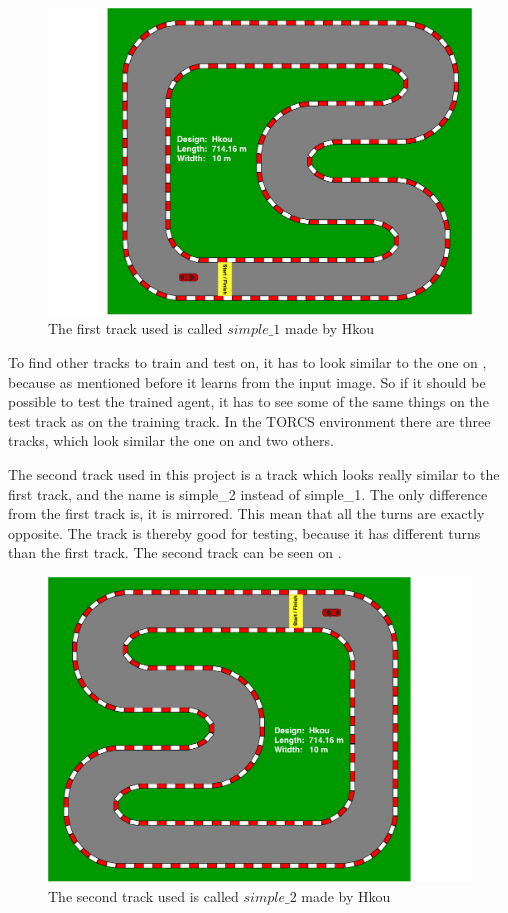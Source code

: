 \begin{figure}[H]
	\centering
	\includegraphics[width=1\textwidth]{Figures/Result/track_simple_1.pdf}
	\caption{The first track used is called $simple\_1$ made by Hkou}
	\label{fig:track_simple_1}
\end{figure}

To find other tracks to train and test on, it has to look similar to the one on , because as mentioned before it learns from the input image. So if it should be possible to test the trained agent, it has to see some of the same things on the test track as on the training track. In the TORCS environment there are three tracks, which look similar the one on  and two others. 

The second track used in this project is a track which looks really similar to the first track, and the name is simple\_2 instead of simple\_1. The only difference from the first track is, it is mirrored. This mean that all the turns are exactly opposite. The track is thereby good for testing, because it has different turns than the first track. The second track can be seen on .

\begin{figure}[H]
	\centering
	\includegraphics[width=1\textwidth]{Figures/Result/track_simple_2.pdf}
	\caption{The second track used is called $simple\_2$ made by Hkou}
	\label{fig:track_simple_2}
\end{figure}

